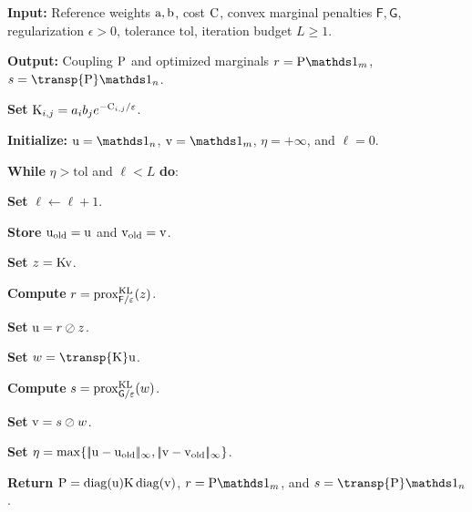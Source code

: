 \begin{alg}\label{alg-generalized-sinkhorn-marginal-penalties}
\textbf{Input:} Reference weights $\a,\b$, cost $\C$, convex marginal penalties $\mathsf F,\mathsf G$, regularization $\epsilon>0$, tolerance $\mathrm{tol}$, iteration budget $L\geq1$.

\textbf{Output:} Coupling $\P$ and optimized marginals $r=\P\ones_m$, $s=\transp{\P}\ones_n$.

\textbf{Set} $\K_{i,j}=a_i b_j e^{-\C_{i,j}/\epsilon}$.

\textbf{Initialize:} $\uD=\ones_n$, $\vD=\ones_m$, $\eta=+\infty$, and $\ell=0$.

\textbf{While} $\eta>\mathrm{tol}$ and $\ell<L$ \textbf{do}:
\begin{algblock}
\textbf{Set} $\ell\leftarrow \ell+1$.

\textbf{Store} $\uD_{\mathrm{old}}=\uD$ and $\vD_{\mathrm{old}}=\vD$.

\textbf{Set} $z=\K\vD$.

\textbf{Compute} $r=\prox_{\mathsf F/\epsilon}^{\KLD}(z)$.

\textbf{Set} $\uD=r\oslash z$.

\textbf{Set} $w=\transp{\K}\uD$.

\textbf{Compute} $s=\prox_{\mathsf G/\epsilon}^{\KLD}(w)$.

\textbf{Set} $\vD=s\oslash w$.

\textbf{Set} $\eta=\max\{\norm{\uD-\uD_{\mathrm{old}}}_\infty,\norm{\vD-\vD_{\mathrm{old}}}_\infty\}$.
\end{algblock}
\algreturnskip
\textbf{Return} $\P=\diag(\uD)\K\diag(\vD)$, $r=\P\ones_m$, and $s=\transp{\P}\ones_n$.
\end{alg}

